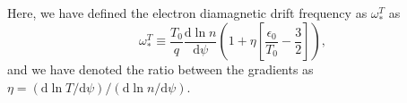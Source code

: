 Here, we have defined the electron diamagnetic drift frequency as $\omega_*^T$ as
\begin{equation}
    \omega_*^T \equiv \frac{T_0}{q} \frac{\mathrm{d} \ln n}{\mathrm{d} \psi} \left( 1 + \eta \left[ \frac{\epsilon_0}{T_0} - \frac{3}{2} \right] \right),
\end{equation}
and we have denoted the ratio between the gradients as $\eta = (\mathrm{d} \ln{T} / \mathrm{d} \psi ) / (\mathrm{d} \ln{n} / \mathrm{d} \psi )$.




